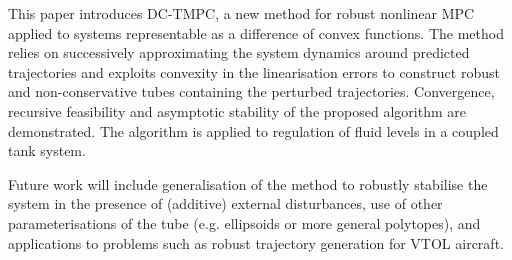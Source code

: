 \documentclass[a4paper, 10 pt, conference]{IEEEconf}
\begin{document}
This paper introduces DC-TMPC, a new method for robust nonlinear MPC applied to systems representable as a difference of convex functions. The method relies on successively approximating the system dynamics around predicted trajectories and exploits convexity in the linearisation errors to construct robust and non-conservative tubes containing the perturbed trajectories. Convergence, recursive feasibility and asymptotic stability of the proposed algorithm are demonstrated. The algorithm is applied to regulation of fluid levels in a coupled tank system. 

Future work will include generalisation of the method to robustly stabilise the system in the presence of (additive) external disturbances, use of other parameterisations of the tube (e.g. ellipsoids or more general polytopes), and applications to problems such as robust trajectory generation for VTOL aircraft.


 

\end{document}
